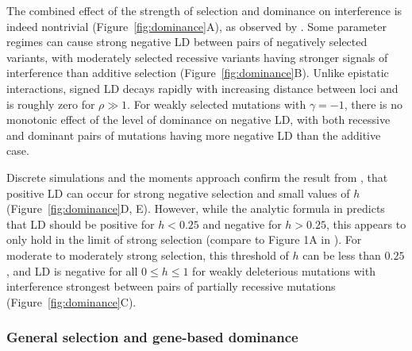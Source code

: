 \documentclass[]{article}
\begin{document}
The combined effect of the strength of selection and dominance on interference
is indeed nontrivial (Figure~\ref{fig:dominance}A), as observed by
\citet{Garcia2021-zn}. Some parameter regimes can cause strong negative LD
between pairs of negatively selected variants, with moderately selected
recessive variants having stronger signals of interference than additive
selection (Figure~\ref{fig:dominance}B). Unlike epistatic interactions, signed
LD decays rapidly with increasing distance between loci and is roughly zero for
\(\rho \gg 1\). For weakly selected mutations with \(\gamma=-1\), there is no
monotonic effect of the level of dominance on negative LD, with both recessive
and dominant pairs of mutations having more negative LD than the additive case.

Discrete simulations and the moments approach confirm the result from
\citet{Roze2021-cf}, that positive LD can occur for strong negative selection
and small values of \(h\) (Figure~\ref{fig:dominance}D, E). However, while the
analytic formula in \citet{Roze2021-cf} predicts that LD should be positive for
\(h<0.25\) and negative for \(h>0.25\), this appears to only hold in the limit
of strong selection (compare to Figure 1A in \citet{Roze2021-cf}). For moderate
to moderately strong selection, this threshold of \(h\) can be less than
\(0.25\), and LD is negative for all \(0\leq h \leq 1\) for weakly deleterious
mutations with interference strongest between pairs of partially recessive
mutations (Figure~\ref{fig:dominance}C).

\subsubsection{General selection and gene-based dominance}
\label{sec:general-selection}
\end{document}
